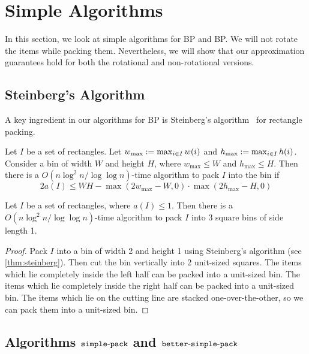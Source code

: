 \section{Simple Algorithms}
\label{sec:simple-algos}

In this section, we look at simple algorithms for  BP
and  BP.
We will not rotate the items while packing them.
Nevertheless, we will show that our approximation guarantees
hold for both the rotational and non-rotational versions.

\subsection{Steinberg's Algorithm}

A key ingredient in our algorithms for  BP is
Steinberg's algorithm~\cite{steinberg1997strip} for rectangle packing.

\begin{lemma}
\label{thm:steinberg}
Let $I$ be a set of rectangles. Let $w_{\max} := \max_{i \in I} w(i)$
and $h_{\max} := \max_{i \in I} h(i)$. Consider a bin of width $W$ and height $H$,
where $w_{\max} \le W$ and $h_{\max} \le H$.
Then there is a $O(n\log^2 n/\log\log n)$-time algorithm to pack $I$ into the bin if
\[ 2a(I) \le WH - \max(2w_{\max} - W, 0) \cdot \max(2h_{\max} - H, 0) \]
\end{lemma}

\begin{lemma}
\label{corr:steinberg}
Let $I$ be a set of rectangles, where $a(I) \le 1$.
Then there is a $O(n\log^2 n/\log\log n)$-time algorithm to pack $I$ into
3 square bins of side length 1.
\end{lemma}
\begin{proof}
Pack $I$ into a bin of width 2 and height 1 using Steinberg's algorithm
(see \cref{thm:steinberg}).
Then cut the bin vertically into 2 unit-sized squares.
The items which lie completely inside the left half can be packed into a unit-sized bin.
The items which lie completely inside the right half can be packed into a unit-sized bin.
The items which lie on the cutting line are stacked one-over-the-other,
so we can pack them into a unit-sized bin.
\end{proof}

\subsection{Algorithms \texorpdfstring{$\operatorname{\mathtt{simple-pack}}$}{simple-pack}
and \texorpdfstring{$\operatorname{\mathtt{better-simple-pack}}$}{better-simple-pack}}
\label{sec:span-pack}


